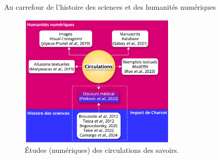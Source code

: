 \begin{frame}{Au carrefour de l'histoire des sciences et des humanités numériques}
\begin{figure}
    \centering
    \includegraphics[width=75mm,scale=0.5]{pic/dh_histoire-sciences.png}
    \caption{Études (numériques) des circulations des savoirs.}
    \label{fig:enter-label}
\end{figure}
\end{frame}